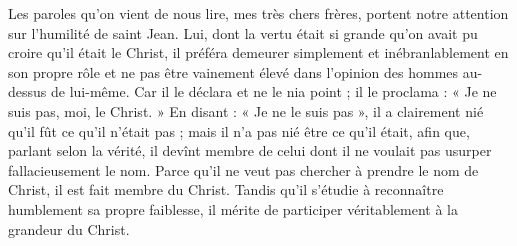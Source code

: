 Les paroles qu’on vient de nous lire, mes très chers frères, portent notre attention sur l’humilité de saint Jean. Lui, dont la vertu était si grande qu’on avait pu croire qu’il était le Christ, il préféra demeurer simplement et inébranlablement en son propre rôle et ne pas être vainement élevé dans l’opinion des hommes au-dessus de lui-même. Car il le déclara et ne le nia point ; il le proclama : « Je ne suis pas, moi, le Christ. » En disant : « Je ne le suis pas », il a clairement nié qu’il fût ce qu’il n’était pas ; mais il n’a pas nié être ce qu’il était, afin que, parlant selon la vérité, il devînt membre de celui dont il ne voulait pas usurper fallacieusement le nom. Parce qu’il ne veut pas chercher à prendre le nom de Christ, il est fait membre du Christ. Tandis qu’il s’étudie à reconnaître humblement sa propre faiblesse, il mérite de participer véritablement à la grandeur du Christ.